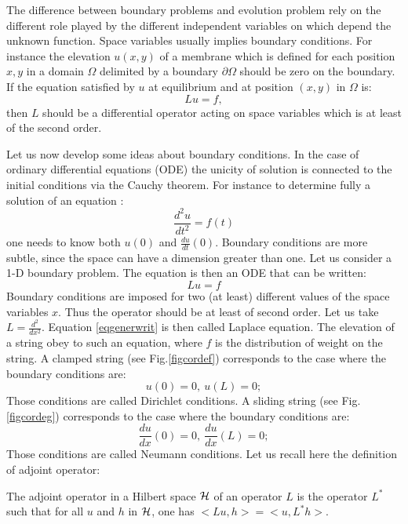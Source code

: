 \documentclass[12pt]{book}
\begin{document}
The difference between boundary problems and evolution problem rely on the
different role played by the different independent variables on which depend
the unknown function.
Space variables usually implies boundary conditions. For instance the
elevation $u(x,y)$ of a membrane which is defined for each position $x,y$ in a
domain $\Omega$ 
delimited by a boundary $\partial \Omega$ should be zero on the boundary.
If the equation satisfied by $u$ at equilibrium and at position
$(x,y)$ in $\Omega$ is: 
\begin{equation}
Lu=f,
\end{equation}
then $L$ should be a differential operator acting on space variables  which is
at least of the second order. 

Let us now develop some ideas about boundary conditions. In the case of
ordinary differential equations (ODE) the unicity of solution is connected to
the initial conditions via the Cauchy theorem. For instance to determine fully
a solution of an equation :
\begin{equation}
\frac{d^2u}{dt^2}=f(t)
\end{equation}
one needs to know both $u(0)$ and $\frac{du}{dt}(0)$.
Boundary conditions are more subtle, since the space can have a dimension
greater than one. Let us consider a 1-D boundary problem. The equation is then
an ODE that can be written:
\begin{equation}\label{eqgenerwrit}
Lu=f
\end{equation}
Boundary conditions are imposed for two (at least) different values of the
space variables $x$. Thus the operator should be at least of second order. Let
us take $L=\frac{d^2}{dx^2}$. Equation \ref{eqgenerwrit} is then
called Laplace equation. The elevation of a
string obey to such an 
equation, where $f$ is the distribution of weight on the string. A clamped
string (see Fig.\ref{figcordef}) corresponds to the case where the boundary
conditions are: 
\begin{equation}
u(0)=0,\ u(L)=0;
\end{equation}
Those conditions are called Dirichlet conditions.
A sliding string (see Fig.\ref{figcordeg}) corresponds to the case where the
boundary conditions are: 
\begin{equation}
\frac{du}{dx}(0)=0,\ \frac{du}{dx}(L)=0;
\end{equation}
Those conditions are called Neumann conditions.
Let us recall here the definition of adjoint 
operator:
\begin{defn} The adjoint operator in a Hilbert space $\cal H$ of an operator
  $L$ is the operator $L^*$ such that for all $u$ and $h$ in
$\cal H$, one has $ \mathrel{<} Lu,h\mathrel{>} = \mathrel{<} u,L^*h\mathrel{>} $.
\end{defn}
\end{document}
